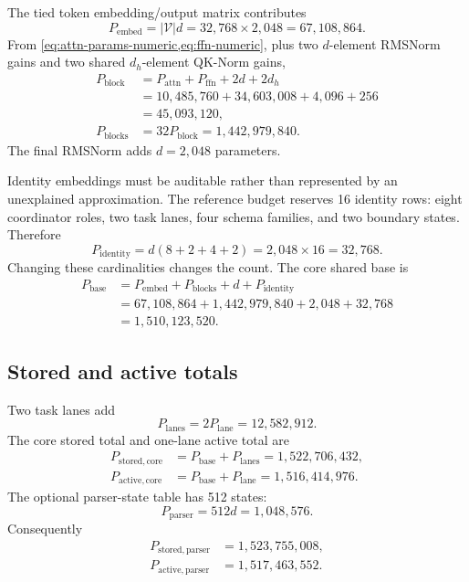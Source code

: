 \documentclass[10pt,letterpaper]{article}
\newcommand{\1}{\mathbb{1}}
\begin{document}
The tied token embedding/output matrix contributes
\begin{equation}
  P_{\mathrm{embed}}=|\mathcal V|d=32{,}768\times2{,}048=67{,}108{,}864.
  \label{eq:embedding-count}
\end{equation}
From \cref{eq:attn-params-numeric,eq:ffn-numeric}, plus two $d$-element RMSNorm gains and two
shared $d_h$-element QK-Norm gains,
\begin{align}
  P_{\mathrm{block}}
  &=P_{\mathrm{attn}}+P_{\mathrm{ffn}}+2d+2d_h\\
  &=10{,}485{,}760+34{,}603{,}008+4{,}096+256\\
  &=45{,}093{,}120,\\
  P_{\mathrm{blocks}}
  &=32P_{\mathrm{block}}=1{,}442{,}979{,}840.
  \label{eq:block-count}
\end{align}
The final RMSNorm adds $d=2{,}048$ parameters.

Identity embeddings must be auditable rather than represented by an unexplained approximation.  The
reference budget reserves 16 identity rows: eight coordinator roles, two task lanes, four schema
families, and two boundary states.  Therefore
\begin{equation}
  P_{\mathrm{identity}}=d(8+2+4+2)=2{,}048\times16=32{,}768.
  \label{eq:identity-count}
\end{equation}
Changing these cardinalities changes the count.  The core shared base is
\begin{align}
  P_{\mathrm{base}}
  &=P_{\mathrm{embed}}+P_{\mathrm{blocks}}+d+P_{\mathrm{identity}}\\
  &=67{,}108{,}864+1{,}442{,}979{,}840+2{,}048+32{,}768\\
  &=1{,}510{,}123{,}520.
  \label{eq:base-count}
\end{align}

\subsection{Stored and active totals}

Two task lanes add
\begin{equation}
  P_{\mathrm{lanes}}=2P_{\mathrm{lane}}=12{,}582{,}912.
\end{equation}
The core stored total and one-lane active total are
\begin{align}
  P_{\mathrm{stored,core}}
  &=P_{\mathrm{base}}+P_{\mathrm{lanes}}
    =1{,}522{,}706{,}432,\\
  P_{\mathrm{active,core}}
  &=P_{\mathrm{base}}+P_{\mathrm{lane}}
    =1{,}516{,}414{,}976.
  \label{eq:core-totals}
\end{align}
The optional parser-state table has 512 states:
\begin{equation}
  P_{\mathrm{parser}}=512d=1{,}048{,}576.
\end{equation}
Consequently
\begin{align}
  P_{\mathrm{stored,parser}}&=1{,}523{,}755{,}008,\\
  P_{\mathrm{active,parser}}&=1{,}517{,}463{,}552.
  \label{eq:parser-totals}
\end{align}
\end{document}
